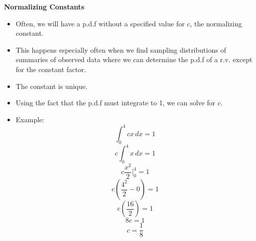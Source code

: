 \documentclass[11pt]{article}
\begin{document}
\textbf{Normalizing Constants}
\begin{itemize}
    \item Often, we will have a p.d.f without a specified value for $c$, 
    the normalizing constant. 
    \item This happens especially often when we find sampling distributions 
    of summaries of observed data where we can determine the p.d.f of a 
    r.v. except for the constant factor.
    \item The constant is unique.
    \item Using the fact that the p.d.f must integrate to 1, we can solve 
    for $c$.
    \item Example:
    \[\int_{0}^{4}cx \,dx = 1\]
    \[c\int_{0}^{4}x \,dx = 1\]
    \[c\frac{x^2}{2}\rvert_0^4 = 1\]
    \[c\left(\frac{4^2}{2}-0\right)= 1\]
    \[c\left(\frac{16}{2}\right)= 1\]
    \[8c= 1\]
    \[c= \frac{1}{8}\]
\end{itemize}
\end{document}

